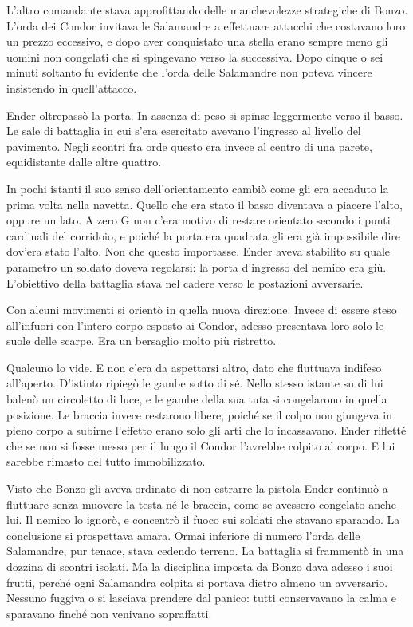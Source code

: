 {L'altro comandante stava approfittando delle manchevolezze strategiche
	di Bonzo. L'orda dei Condor invitava le Salamandre a effettuare attacchi
	che costavano loro un prezzo eccessivo, e dopo aver conquistato una
	stella erano sempre meno gli uomini non congelati che si spingevano
	verso la successiva. Dopo cinque o sei minuti soltanto fu evidente che
	l'orda delle Salamandre non poteva vincere insistendo in quell'attacco.}

{Ender oltrepassò la porta. In assenza di peso si spinse leggermente
	verso il basso. Le sale di battaglia in cui s'era esercitato avevano
	l'ingresso al livello del pavimento. Negli scontri fra orde questo era
	invece al centro di una parete, equidistante dalle altre quattro.}

{In pochi istanti il suo senso dell'orientamento cambiò come gli era
	accaduto la prima volta nella navetta. Quello che era stato il basso
	diventava a piacere l'alto, oppure un lato. A zero G non c'era motivo di
	restare orientato secondo i punti cardinali del corridoio, e poiché la
	porta era quadrata gli era già impossibile dire dov'era stato l'alto.
	Non che questo importasse. Ender aveva stabilito su quale parametro un
	soldato doveva regolarsi: la porta d'ingresso del nemico era giù.
	L'obiettivo della battaglia stava nel cadere verso le postazioni
	avversarie.}

{Con alcuni movimenti si orientò in quella nuova direzione. Invece di
	essere steso all'infuori con l'intero corpo esposto ai Condor, adesso
	presentava loro solo le suole delle scarpe. Era un bersaglio molto più
	ristretto.}

{Qualcuno lo vide. E non c'era da aspettarsi altro, dato che fluttuava
	indifeso all'aperto. D'istinto ripiegò le gambe sotto di sé. Nello
	stesso istante su di lui balenò un circoletto di luce, e le gambe della
	sua tuta si congelarono in quella posizione. Le braccia invece restarono
	libere, poiché se il colpo non giungeva in pieno corpo a subirne
	l'effetto erano solo gli arti che lo incassavano. Ender rifletté che se
	non si fosse messo per il lungo il Condor l'avrebbe colpito al corpo. E
	lui sarebbe rimasto del tutto immobilizzato.}

{Visto che Bonzo gli aveva ordinato di non estrarre la pistola Ender
	continuò a fluttuare senza muovere la testa né le braccia, come se
	avessero congelato anche lui. Il nemico lo ignorò, e concentrò il fuoco
	sui soldati che stavano sparando. La conclusione si prospettava amara.
	Ormai inferiore di numero l'orda delle Salamandre, pur tenace, stava
	cedendo terreno. La battaglia si frammentò in una dozzina di scontri
	isolati. Ma la disciplina imposta da Bonzo dava adesso i suoi frutti,
	perché ogni Salamandra colpita si portava dietro almeno un avversario.
	Nessuno fuggiva o si lasciava prendere dal panico: tutti conservavano la
	calma e sparavano finché non venivano sopraffatti.}

